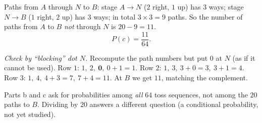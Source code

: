 {
Paths from $A$ through $N$ to $B$: stage $A\to N$ ($2$ right, $1$ up) has $3$ ways; stage $N\to B$ ($1$ right, $2$ up) has $3$ ways;
in total $3\times3=9$ paths. So the number of paths from $A$ to $B$ \emph{not} through $N$ is $20-9=11$.
\[P(c)=\frac{11}{64}.\]
\begin{proofbox}\emph{Check by ``blocking'' dot $N$.} Recompute the path numbers but put $0$ at $N$ (as if it cannot be used).
Row $1$: $1,\ 2,\ \mathbf{0},\ 0+1=1$. Row $2$: $1,\ 3,\ 3+0=3,\ 3+1=4$. Row $3$: $1,\ 4,\ 4+3=7,\ 7+4=11$.
At $B$ we get $11$, matching the complement.\end{proofbox}
\begin{warnbox}Parts b and c ask for probabilities among \emph{all} $64$ toss sequences, not among the $20$ paths to $B$. Dividing by $20$
answers a different question (a conditional probability, not yet studied).\end{warnbox}
}


